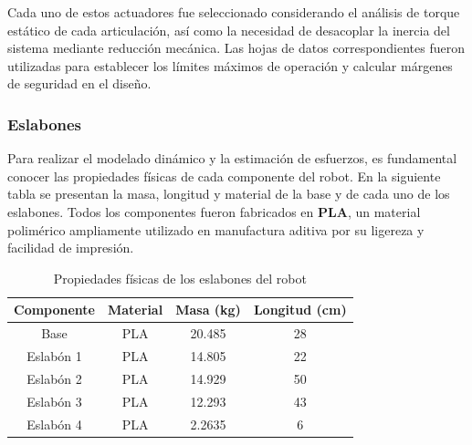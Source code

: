 Cada uno de estos actuadores fue seleccionado considerando el análisis de torque estático de cada articulación, así como la necesidad de desacoplar la inercia del sistema mediante reducción mecánica. Las hojas de datos correspondientes fueron utilizadas para establecer los límites máximos de operación y calcular márgenes de seguridad en el diseño.


\subsubsection{Eslabones} \label{subsubsec:eslabones}
Para realizar el modelado dinámico y la estimación de esfuerzos, es fundamental conocer las propiedades físicas de cada componente del robot. En la siguiente tabla se presentan la masa, longitud y material de la base y de cada uno de los eslabones. Todos los componentes fueron fabricados en \textbf{PLA}, un material polimérico ampliamente utilizado en manufactura aditiva por su ligereza y facilidad de impresión.

\begin{table}[H]
\centering
\begin{tabular}{|c|c|c|c|}
\hline
\textbf{Componente} & \textbf{Material} & \textbf{Masa (kg)} & \textbf{Longitud (cm)} \\
\hline
Base        & PLA & 20.485   & 28  \\
Eslabón 1   & PLA & 14.805   & 22  \\
Eslabón 2   & PLA & 14.929   & 50  \\
Eslabón 3   & PLA & 12.293   & 43  \\
Eslabón 4   & PLA & 2.2635   & 6   \\
\hline
\end{tabular}
\caption{Propiedades físicas de los eslabones del robot}
\label{tab:propiedades_eslabones}
\end{table}
